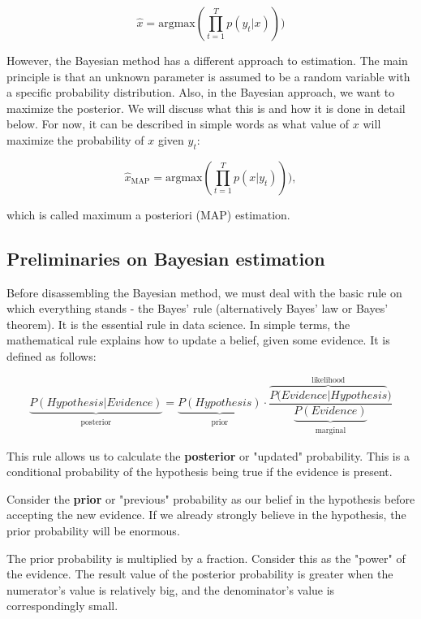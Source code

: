\begin{equation}
\hat{x} = \mathrm{argmax}(\prod_{t=1}^T p(y_t|x)))
\end{equation}

However, the Bayesian method has a different approach to estimation. The main principle is that an unknown parameter is assumed to be a random variable with a specific probability distribution. Also, in the  Bayesian approach, we want to maximize the posterior. We will discuss what this is and how it is done in detail below. For now, it can be described in simple words as what value of \(x\) will maximize the probability of \(x\) given \(y_t\):

\begin{equation}
\hat{x}_{\mathrm{MAP}} = \mathrm{argmax}(\prod_{t=1}^T p(x|y_t))),
\end{equation}

\noindent which is called maximum a posteriori (MAP) estimation.

\subsection{Preliminaries on Bayesian estimation}
Before disassembling the Bayesian method, we must deal with the basic rule on which everything stands - the Bayes' rule (alternatively Bayes' law or Bayes' theorem). It is the essential rule in data science. In simple terms, the mathematical rule explains how to update a belief, given some evidence. It is defined as follows:

\begin{equation}
\underbrace{P(Hypothesis|Evidence)}_{\substack{\text{posterior}}} = \underbrace{P(Hypothesis)}_{\substack{\text{prior}}} \cdot \frac{\overbrace{P(Evidence|Hypothesis}^{\text{likelihood}})}{\underbrace{P(Evidence)}_{\substack{\text{marginal}}}}
\label{eq:bayes_rule}
\end{equation}

This rule allows us to calculate the \textbf{posterior} or "updated" probability. This is a conditional probability of the hypothesis being true if the evidence is present. 

Consider the \textbf{prior} or "previous" probability as our belief in the hypothesis before accepting the new evidence. If we already strongly believe in the hypothesis, the prior probability will be enormous.

The prior probability is multiplied by a fraction. Consider this as the "power" of the evidence. The result value of the posterior probability is greater when the numerator's value is relatively big, and the denominator's value is correspondingly small.


